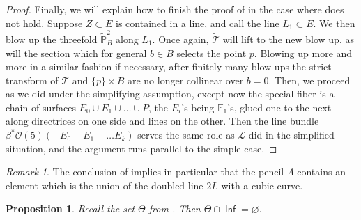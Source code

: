 \documentclass[reqno, 11pt]{amsart}
\theoremstyle{plain}
\newtheorem{proposition}[theorem]{Proposition}
\theoremstyle{remark}
\newtheorem{remark}[theorem]{Remark}
\renewcommand{\P}{\mathbb{P}}
\renewcommand{\O}{\mathcal{O}}
\DeclareMathOperator{\Inf}{\mathsf{Inf}}
\begin{document}
\begin{proof}
Finally, we will explain how to finish the proof of  in the case where  does not hold. Suppose $Z \subset E$ is contained in a line, and call the line $L_1 \subset E$.  We then blow up the threefold $\widetilde{\P}^{2}_{B}$ along $L_1$.  Once again, $\widetilde{\mathcal{T}}$ will lift to the new blow up, as will the section which for general $b \in B$ selects the point $p$. Blowing up more and more in a similar fashion if necessary, after finitely many blow ups the strict transform of $\mathcal{T}$ and $\{p\} \times B$ are no longer collinear over $b=0$.  Then, we proceed as we did under the simplifying assumption, except now the special fiber is a chain of surfaces $E_0 \cup E_{1} \cup \dots \cup P$, the $E_{i}$'s being $\mathbb{F}_{1}$'s, glued one to the next along directrices on one side and lines on the other.  Then the line bundle $\beta^{*}\O(5)(-E_{0}-E_{1}-\dots E_{k})$ serves the same role as $\mathcal{L}$ did in the simplified situation, and the argument runs parallel to the simple case. 
\end{proof}

\begin{remark}
\label{remark:splitline}
    The conclusion of  implies in particular that the pencil $\Lambda$ contains an element which is the union of the doubled line $2L$ with a cubic curve.
\end{remark}




\begin{proposition}
    \label{lemma:ThetaInf} Recall the set $\Theta$ from . Then $\Theta \cap \Inf = \varnothing.$
\end{proposition}
\end{document}
